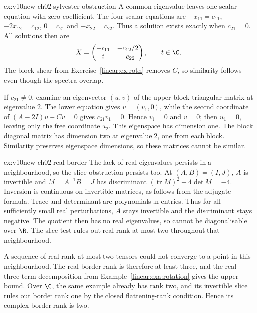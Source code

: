 \begin{solution}{ex:v10new-ch02-sylvester-obstruction}
\idea A common eigenvalue leaves one scalar equation with zero coefficient.
\writeup The four scalar equations are $-x_{11}=c_{11}$, $-2x_{12}=c_{12}$, $0=c_{21}$ and $-x_{22}=c_{22}$. Thus a solution exists exactly when $c_{21}=0$. All solutions then are
\[
X=\begin{pmatrix}-c_{11}&-c_{12}/2\\t&-c_{22}\end{pmatrix},\qquad t\in\C.
\]
The block shear from Exercise~\ref{linear:ex:roth} removes $C$, so similarity follows even though the spectra overlap.

If $c_{21}\ne0$, examine an eigenvector $(u,v)$ of the upper block triangular matrix at eigenvalue $2$. The lower equation gives $v=(v_1,0)$, while the second coordinate of $(A-2I)u+Cv=0$ gives $c_{21}v_1=0$. Hence $v_1=0$ and $v=0$; then $u_1=0$, leaving only the free coordinate $u_2$. This eigenspace has dimension one. The block diagonal matrix has dimension two at eigenvalue $2$, one from each block. Similarity preserves eigenspace dimensions, so these matrices cannot be similar.
\end{solution}

\begin{solution}{ex:v10new-ch02-real-border}
\idea The lack of real eigenvalues persists in a neighbourhood, so the slice obstruction persists too.
\writeup At $(A,B)=(I,J)$, $A$ is invertible and $M=A^{-1}B=J$ has discriminant $(\operatorname{tr}M)^2-4\det M=-4$. Inversion is continuous on invertible matrices, as follows from the adjugate formula. Trace and determinant are polynomials in entries. Thus for all sufficiently small real perturbations, $A$ stays invertible and the discriminant stays negative. The quotient then has no real eigenvalues, so cannot be diagonalisable over $\R$. The slice test rules out real rank at most two throughout that neighbourhood.

A sequence of real rank-at-most-two tensors could not converge to a point in this neighbourhood. The real border rank is therefore at least three, and the real three-term decomposition from Example~\ref{linear:exa:rotation} gives the upper bound. Over $\C$, the same example already has rank two, and its invertible slice rules out border rank one by the closed flattening-rank condition. Hence its complex border rank is two.
\end{solution}

